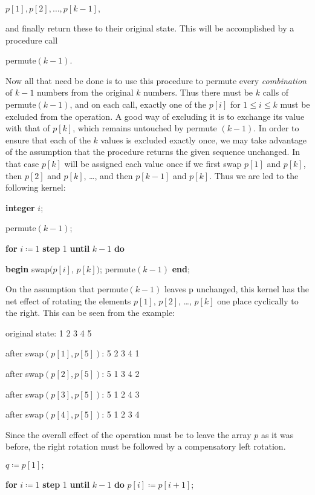 \quad $p[1], p[2], \dots, p[k - 1],$

\noindent
and finally return these to their original state. This will be accomplished by a procedure call

\quad permute$(k - 1)$.

\noindent
Now all that need be done is to use this procedure to permute every \textit{combination} of $k - 1$ numbers from the original $k$ numbers. Thus there must be $k$ calls of permute$(k - 1)$, and on each call, exactly one of the $p[i]$ for $1 \leqslant i \leqslant k$ must be excluded from the operation. A good way of excluding it is to exchange its value with that of $p[k]$, which remains untouched by permute $(k - 1)$. In order to ensure that each of the $k$ values is excluded exactly once, we may take advantage of the assumption that the procedure returns the given sequence unchanged. In that case $p[k]$ will be assigned each value once if we first swap $p[1]$ and $p[k]$, then $p[2]$ and $p[k]$, \dots, and then $p[k - 1]$ and $p[k]$. Thus we are led to the following kernel:

\quad \textbf{integer} $i$;

\quad permute$(k - 1)$;

\quad \textbf{for} $i\coloneq 1$ \textbf{step} 1 \textbf{until} $k - 1$ \textbf{do}

\quad \quad \textbf{begin} swap$(p[i]$, $p[k])$; permute$(k - 1)$ \textbf{end};

\noindent
On the assumption that permute$(k - 1)$ leaves p unchanged, this kernel has the net effect of rotating the elements $p[1]$, $p[2]$, \dots, $p[k]$ one place cyclically to the right. This can be seen from the example:

\quad original state:\tabto*{12em}  1 2 3 4 5

\quad after swap$(p[1], p[5])$:\tabto*{12em} 5 2 3 4 1

\quad after swap$(p[2], p[5])$:\tabto*{12em}  5 1 3 4 2

\quad after swap$(p[3], p[5])$:\tabto*{12em}  5 1 2 4 3

\quad after swap$(p[4], p[5])$:\tabto*{12em}  5 1 2 3 4

\noindent
Since the overall effect of the operation must be to leave the array $p$ as it was before, the right rotation must be followed by a compensatory left rotation.

\quad $q\coloneq p[1];$

\quad \textbf{for} $i\coloneq 1$ \textbf{step} 1 \textbf{until} $k - 1$ \textbf{do} $p[i]\coloneq p[i + 1]$;

